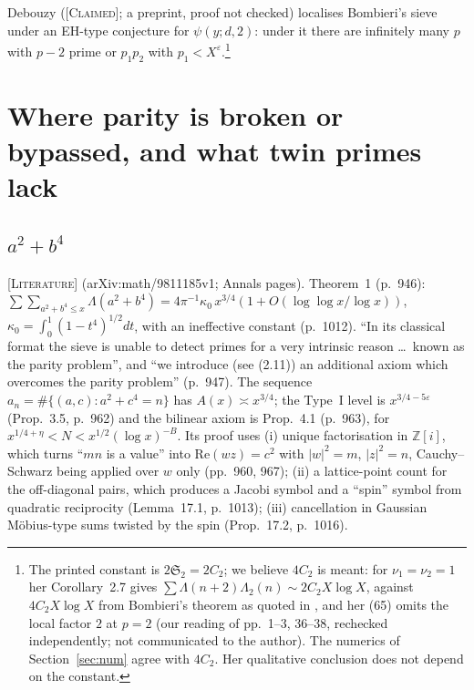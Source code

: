 \documentclass[11pt]{amsart}
\theoremstyle{definition}
\theoremstyle{remark}
\newcommand{\lbl}[1]{\textup{\textsc{[#1]}}}
\begin{document}
\begin{sloppypar}Debouzy \cite[Thm.~0.2, Cor.~2.7]{De19} (\lbl{Claimed}; a preprint, proof
not checked) localises Bombieri's sieve under an EH-type conjecture for
$\psi(y;d,2)$: under it there are infinitely many $p$ with $p-2$ prime or
$p_1p_2$ with $p_1<X^\varepsilon$.\footnote{\begin{sloppypar}The printed constant is
$2\mathfrak S_2=2C_2$; we believe $4C_2$ is meant: for $\nu_1=\nu_2=1$ her
Corollary~2.7 gives $\sum\Lambda(n+2)\Lambda_2(n)\sim2C_2X\log X$, against $4C_2X\log X$
from Bombieri's theorem as quoted in \cite[(1.3)]{Fo04}, and her (65) omits the
local factor $2$ at $p=2$ (our reading of pp.~1--3, 36--38, rechecked
independently; not communicated to the author). The numerics of
Section~\ref{sec:num} agree with $4C_2$. Her qualitative conclusion does not
depend on the constant.\end{sloppypar}}\end{sloppypar}

\section{Where parity is broken or bypassed, and what twin primes lack}\label{sec:broken}

\subsection{\texorpdfstring{$a^2+b^4$}{a\textasciicircum 2+b\textasciicircum 4}}\label{subsec:fi-x2y4}
\lbl{Literature} \cite{FI98b} (arXiv:math/9811185v1; Annals pages). Theorem~1
(p.~946): $\sum\sum_{a^2+b^4\le x}\Lambda(a^2+b^4)=4\pi^{-1}\kappa_0\,x^{3/4}
(1+O(\log\log x/\log x))$, $\kappa_0=\int_0^1(1-t^4)^{1/2}dt$, with an ineffective
constant (p.~1012). ``In its classical format the sieve is unable to detect
primes for a very intrinsic reason \dots\ known as the parity problem'', and
``we introduce (see (2.11)) an additional axiom which overcomes the parity
problem'' (p.~947). The sequence $a_n=\#\{(a,c):a^2+c^4=n\}$ has
$A(x)\asymp x^{3/4}$; the Type~I level is $x^{3/4-5\varepsilon}$ (Prop.~3.5, p.~962)
and the bilinear axiom is Prop.~4.1 (p.~963), for
$x^{1/4+\eta}<N<x^{1/2}(\log x)^{-B}$. Its proof uses (i) unique factorisation
in $\mathbb Z[i]$, which turns ``$mn$ is a value'' into $\mathrm{Re}(wz)=c^2$
with $|w|^2=m$, $|z|^2=n$, Cauchy--Schwarz being applied over $w$ only
(pp.~960, 967); (ii) a lattice-point count for the off-diagonal pairs, which
produces a Jacobi symbol and a ``spin'' symbol from quadratic reciprocity
(Lemma~17.1, p.~1013); (iii) cancellation in Gaussian M\"obius-type sums
twisted by the spin (Prop.~17.2, p.~1016).
\end{document}
